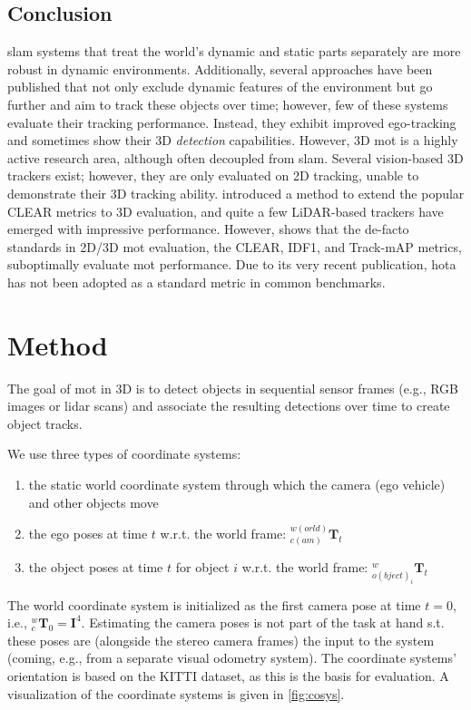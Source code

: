 \documentclass[headsepline, hidelinks, footsepline, footinclude=false, oneside, fontsize=11pt, paper=a4, listof=totoc, bibliography=totoc]{scrbook}
\begin{document}
\section{Conclusion}
\label{sec:orgfc2423c}
   \gls{slam} systems that treat the world's dynamic and static parts separately are more robust in dynamic environments. Additionally, several approaches have been published that not only exclude dynamic features of the environment but go further and aim to track these objects over time; however, few of these systems evaluate their tracking performance. Instead, they exhibit improved ego-tracking and sometimes show
their 3D \emph{detection} capabilities. However, 3D \gls{mot} is a highly active research area, although often decoupled from \gls{slam}. 
Several vision-based 3D trackers exist; however, they are only evaluated on 2D tracking, unable to demonstrate their 3D tracking ability.
\cite{wengBaseline3DMultiObject2019} introduced a method to extend the popular CLEAR metrics to 3D evaluation, and quite a few LiDAR-based trackers have emerged with impressive performance. 
However, \cite{luitenHOTAHigherOrder2021} shows that the de-facto standards in 2D/3D \gls{mot} evaluation, the CLEAR, IDF1, and Track-mAP metrics,
suboptimally evaluate \gls{mot} performance. Due to its very recent publication, \gls{hota} has not been adopted as a standard metric in common benchmarks.


\newpage
\chapter{Method \label{method}}
\label{sec:orgd918fa6}
The goal of \gls{mot} in 3D is to detect objects in sequential sensor frames (e.g., RGB images or \gls{lidar} scans) and associate the resulting detections over time to create object tracks. 

We use three types of coordinate systems:
\begin{enumerate}
\item the static world coordinate system through which the camera (ego vehicle) and other objects move
\item the ego poses at time \(t\) w.r.t. the world frame: \({}^{w(orld)}_{c(am)}\mathbf{T}_{t}\)
\item the object poses at time \(t\) for object \(i\) w.r.t. the world frame: \({}^{w}_{o(bject)_i}\mathbf{T}_{t}\)
\end{enumerate}

The world coordinate system is initialized as the first camera pose at time \(t=0\), i.e., \({}^{w}_{c}\mathbf{T}_0 = \mathbf{I}^4\). Estimating the camera poses is not part of the task at hand s.t. these poses
are (alongside the stereo camera frames) the input to the system (coming, e.g., from a separate visual odometry system). The coordinate systems' orientation is based on the KITTI dataset, as this is the basis for evaluation.
A visualization of the coordinate systems is given in \cref{fig:cosys}.
\end{document}
